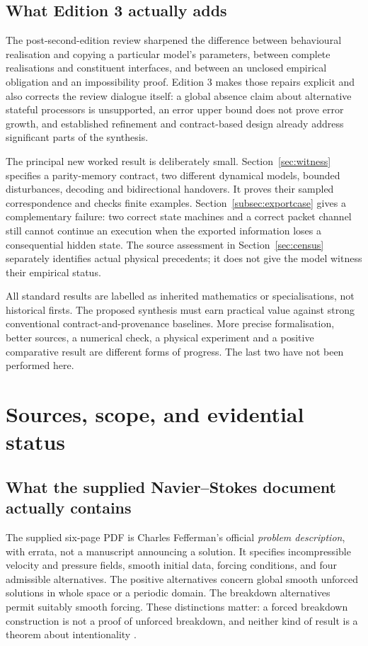 \documentclass[11pt,a4paper]{article}
\theoremstyle{definition}
\theoremstyle{remark}
\begin{document}
\subsection{What Edition 3 actually adds}
The post-second-edition review sharpened the difference between behavioural realisation and copying a particular model's parameters, between complete realisations and constituent interfaces, and between an unclosed empirical obligation and an impossibility proof. Edition 3 makes those repairs explicit and also corrects the review dialogue itself: a global absence claim about alternative stateful processors is unsupported, an error upper bound does not prove error growth, and established refinement and contract-based design already address significant parts of the synthesis.

The principal new worked result is deliberately small. Section~\ref{sec:witness} specifies a parity-memory contract, two different dynamical models, bounded disturbances, decoding and bidirectional handovers. It proves their sampled correspondence and checks finite examples. Section~\ref{subsec:exportcase} gives a complementary failure: two correct state machines and a correct packet channel still cannot continue an execution when the exported information loses a consequential hidden state. The source assessment in Section~\ref{sec:census} separately identifies actual physical precedents; it does not give the model witness their empirical status.

All standard results are labelled as inherited mathematics or specialisations, not historical firsts. The proposed synthesis must earn practical value against strong conventional contract-and-provenance baselines. More precise formalisation, better sources, a numerical check, a physical experiment and a positive comparative result are different forms of progress. The last two have not been performed here.

\section{Sources, scope, and evidential status}\label{sec:sources}
\subsection{What the supplied Navier--Stokes document actually contains}
The supplied six-page PDF is Charles Fefferman's official \emph{problem description}, with errata, not a manuscript announcing a solution. It specifies incompressible velocity and pressure fields, smooth initial data, forcing conditions, and four admissible alternatives. The positive alternatives concern global smooth unforced solutions in whole space or a periodic domain. The breakdown alternatives permit suitably smooth forcing. These distinctions matter: a forced breakdown construction is not a proof of unforced breakdown, and neither kind of result is a theorem about intentionality \citep{fefferman}.
\end{document}
